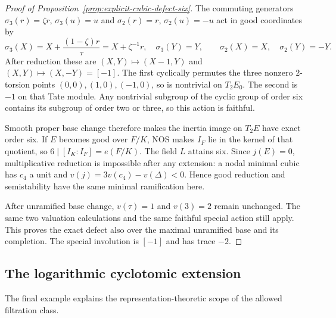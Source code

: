 \begin{proof}[Proof of Proposition~\ref{prop:explicit-cubic-defect-six}]
The commuting generators $\sigma_3(r)=\zeta r$, $\sigma_3(u)=u$ and $\sigma_2(r)=r$, $\sigma_2(u)=-u$ act in good coordinates by
\[
 \sigma_3(X)=X+\frac{(1-\zeta)r}{\tau}=X+\zeta^{-1}r,
 \quad \sigma_3(Y)=Y,
 \qquad \sigma_2(X)=X,\quad\sigma_2(Y)=-Y.
\]
After reduction these are $(X,Y)\mapsto(X-1,Y)$ and $(X,Y)\mapsto(X,-Y)=[-1]$. The first cyclically permutes the three nonzero $2$-torsion points $(0,0),(1,0),(-1,0)$, so is nontrivial on $T_2E_0$. The second is $-1$ on that Tate module. Any nontrivial subgroup of the cyclic group of order six contains its subgroup of order two or three, so this action is faithful.

Smooth proper base change therefore makes the inertia image on $T_2E$ have exact order six. If $E$ becomes good over $F/K$, NOS makes $I_F$ lie in the kernel of that quotient, so $6\mid[I_K:I_F]=e(F/K)$. The field $L$ attains six. Since $j(E)=0$, multiplicative reduction is impossible after any extension: a nodal minimal cubic has $c_4$ a unit and $v(j)=3v(c_4)-v(\Delta)<0$. Hence good reduction and semistability have the same minimal ramification here.

After unramified base change, $v(\tau)=1$ and $v(3)=2$ remain unchanged. The same two valuation calculations and the same faithful special action still apply. This proves the exact defect also over the maximal unramified base and its completion. The special involution is $[-1]$ and has trace $-2$.
\end{proof}

\subsection{The logarithmic cyclotomic extension}
The final example explains the representation-theoretic scope of the allowed filtration class.


